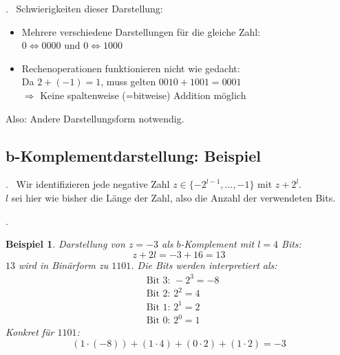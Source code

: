 \documentclass{beamer}
\newtheorem{beispiel}[satz]{Beispiel}
\newcommand{\subsecframe}{\begin{frame}{\insertsectionnumber.\insertsubsectionnumber \ \insertsubsection}}
\begin{document}
        \subsecframe
            Schwierigkeiten dieser Darstellung:
            \begin{itemize}
                \item Mehrere verschiedene Darstellungen für die gleiche Zahl: \\
                    $0 \Leftrightarrow 0000$ und $0 \Leftrightarrow 1000$
                \item Rechenoperationen funktionieren nicht wie gedacht: \\
                    Da $2 + (-1) = 1$, muss gelten $0010 + 1001 = 0001$ \\
                    $\Rightarrow$ Keine spaltenweise (=bitweise) Addition möglich
            \end{itemize}
            \vspace{\baselineskip}
            Also: Andere Darstellungsform notwendig.
        \end{frame}

    \subsection{b-Komplementdarstellung: Beispiel}

        \subsecframe
            Wir identifizieren jede negative Zahl $z \in \{-2^{l-1}, \dots, -1\}$ mit $z + 2^l$. \\
            $l$ sei hier wie bisher die Länge der Zahl, also die Anzahl der verwendeten Bits.
        \end{frame}

        \subsecframe
            \begin{beispiel}
                Darstellung von $z=-3$ als $b$-Komplement mit $l=4$ Bits:
                \[z + 2l = -3 + 16 = 13\]
                $13$ wird in Binärform zu $1101$. Die Bits werden interpretiert als:
                \begin{align*}
                    &\text{Bit 3: } -2^3 = -8 \\
                    &\text{Bit 2: } 2^2 = 4 \\
                    &\text{Bit 1: } 2^1 = 2 \\
                    &\text{Bit 0: } 2^0 = 1
                \end{align*}                
                Konkret für $1101$:
                \[(1 \cdot (-8)) + (1 \cdot 4) + (0 \cdot 2) + (1 \cdot 2) = -3\]
            \end{beispiel}
        \end{frame}
\end{document}
